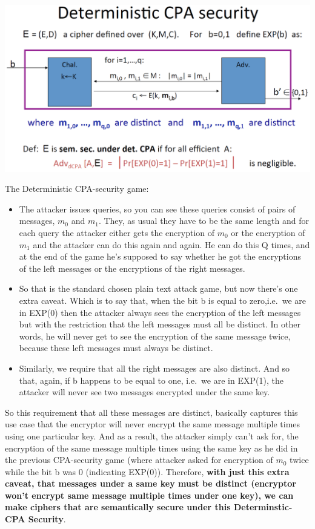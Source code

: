 \documentclass[11pt]{article}
\makeatletter
\def\maxwidth{\ifdim\Gin@nat@width>\linewidth\linewidth
    \else\Gin@nat@width\fi}
\let\Oldincludegraphics\includegraphics
\renewcommand{\includegraphics}[1]{\Oldincludegraphics[width=.8\maxwidth]{#1}}
\providecommand{\tightlist}{%
      \setlength{\itemsep}{0pt}\setlength{\parskip}{0pt}}
\makeatother
\begin{document}
\includegraphics{./Images/DetCPASecure.png}

The Deterministic CPA-security game:

\begin{itemize}
\tightlist
\item
  The attacker issues queries, so you can see these queries consist of
  pairs of messages, \(m_{0}\) and \(m_{1}\). They, as usual they have
  to be the same length and for each query the attacker either gets the
  encryption of \(m_{0}\) or the encryption of \(m_{1}\) and the
  attacker can do this again and again. He can do this Q times, and at
  the end of the game he's supposed to say whether he got the
  encryptions of the left messages or the encryptions of the right
  messages.
\item
  So that is the standard chosen plain text attack game, but now there's
  one extra caveat. Which is to say that, when the bit b is equal to
  zero,i.e.~we are in EXP(0) then the attacker always sees the
  encryption of the left messages but with the restriction that the left
  messages must all be distinct. In other words, he will never get to
  see the encryption of the same message twice, because these left
  messages must always be distinct.
\item
  Similarly, we require that all the right messages are also distinct.
  And so that, again, if b happens to be equal to one, i.e.~we are in
  EXP(1), the attacker will never see two messages encrypted under the
  same key.
\end{itemize}

So this requirement that all these messages are distinct, basically
captures this use case that the encryptor will never encrypt the same
message multiple times using one particular key. And as a result, the
attacker simply can't ask for, the encryption of the same message
multiple times using the same key as he did in the previous CPA-security
game (where attacker asked for encryption of \(m_{0}\) twice while the
bit b was 0 (indicating EXP(0)). Therefore, \textbf{with just this extra
caveat, that messages under a same key must be distinct (encryptor won't
encrypt same message multiple times under one key), we can make ciphers
that are semantically secure under this Determinstic-CPA Security}.
\end{document}
